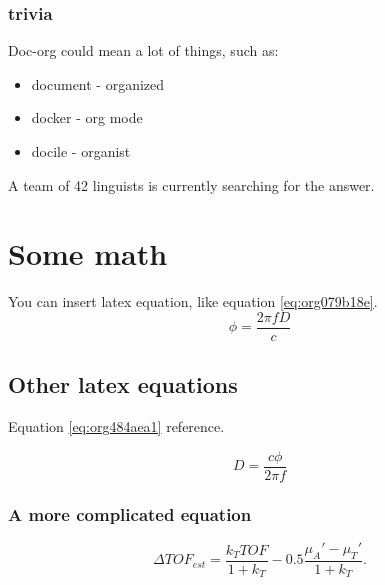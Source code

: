 \subsubsection{trivia}
\label{sec:org355d0b3}
Doc-org could mean a lot of things, such as:
\begin{itemize}
\item document - organized
\item docker - org mode
\item docile - organist
\end{itemize}
A team of 42 linguists is currently searching for the answer.

\section{Some math}
\label{sec:orgf847ceb}
You can insert latex equation, like equation \ref{eq:org079b18e}.
\begin{equation}
\label{eq:org079b18e}
\phi = \frac{2\pi fD}{c}
\end{equation}
\subsection{Other latex equations}
\label{sec:orgc2eb395}
Equation \ref{eq:org484aea1} reference.

\begin{equation}
\label{eq:org484aea1}
D = \frac{c\phi}{2\pi f}
\end{equation}

\subsubsection{A more complicated equation}
\label{sec:org837c08b}

\begin{equation}
\Delta TOF_{est} = \frac{k_T TOF}{1+k_T } - 0.5 \frac{\mu_A' - \mu_T'}{1+k_T}.
\end{equation}


